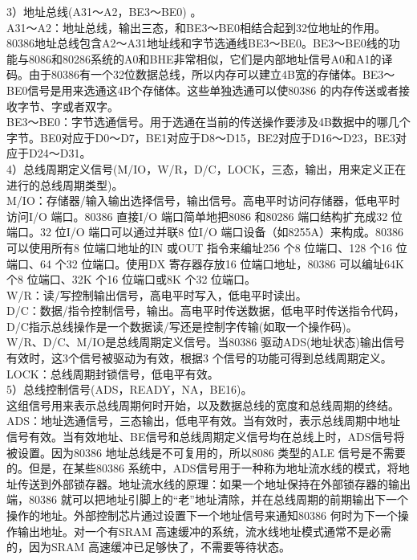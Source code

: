 \documentclass[12pt]{article}
\begin{document}
3）地址总线(A31～A2，BE3～BE0) 。\\
A31～A2：地址总线，输出三态，和BE3～BE0相结合起到32位地址的作用。80386地址总线包含A2～A31地址线和字节选通线BE3～BE0。BE3～BE0线的功能与8086和80286系统的A0和BHE非常相似，它们是内部地址信号A0和A1的译码。由于80386有一个32位数据总线，所以内存可以建立4B宽的存储体。BE3～BE0信号是用来选通这4B个存储体。这些单独选通可以使80386 的内存传送或者接收字节、字或者双字。\\
BE3～BE0：字节选通信号。用于选通在当前的传送操作要涉及4B数据中的哪几个字节。BE0对应于D0～D7，BE1对应于D8～D15，BE2对应于D16～D23，BE3对应于D24～D31。\\
4）总线周期定义信号(M/IO，W/R，D/C，LOCK，三态，输出，用来定义正在进行的总线周期类型)。\\
M/IO：存储器/输入输出选择信号，输出信号。高电平时访问存储器，低电平时访问I/O 端口。80386 直接I/O 端口简单地把8086 和80286 端口结构扩充成32 位端口。32 位I/O 端口可以通过并联8 位I/O 端口设备（如8255A）来构成。80386 可以使用所有8 位端口地址的IN 或OUT 指令来编址256 个8 位端口、128 个16 位端口、64 个32 位端口。使用DX 寄存器存放16 位端口地址，80386 可以编址64K 个8 位端口、32K 个16 位端口或8K 个32 位端口。\\
W/R：读/写控制输出信号，高电平时写入，低电平时读出。\\
D/C：数据/指令控制信号，输出。高电平时传送数据，低电平时传送指令代码，D/C指示总线操作是一个数据读/写还是控制字传输(如取一个操作码)。\\
W/R、D/C、M/IO是总线周期定义信号。当80386 驱动ADS(地址状态)输出信号有效时，这3个信号被驱动为有效，根据3 个信号的功能可得到总线周期定义。\\
LOCK：总线周期封锁信号，低电平有效。\\
5）总线控制信号(ADS，READY，NA，BE16)。\\
这组信号用来表示总线周期何时开始，以及数据总线的宽度和总线周期的终结。\\   ADS：地址选通信号，三态输出，低电平有效。当有效时，表示总线周期中地址信号有效。当有效地址、BE信号和总线周期定义信号均在总线上时，ADS信号将被设置。因为80386 地址总线是不可复用的，所以8086 类型的ALE 信号是不需要的。但是，在某些80386 系统中，ADS信号用于一种称为地址流水线的模式，将地址传送到外部锁存器。地址流水线的原理：如果一个地址保持在外部锁存器的输出端，80386 就可以把地址引脚上的“老”地址清除，并在总线周期的前期输出下一个操作的地址。外部控制芯片通过设置下一个地址信号来通知80386 何时为下一个操作输出地址。对一个有SRAM 高速缓冲的系统，流水线地址模式通常不是必需的，因为SRAM 高速缓冲已足够快了，不需要等待状态。\\
\end{document}
